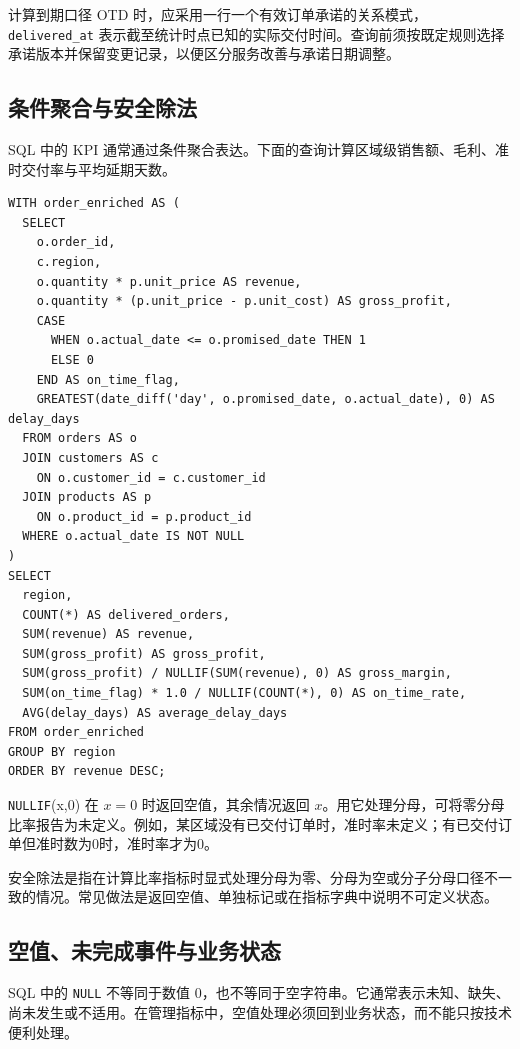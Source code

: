 计算到期口径 OTD 时，应采用一行一个有效订单承诺的关系模式，\texttt{delivered\_at} 表示截至统计时点已知的实际交付时间。查询前须按既定规则选择承诺版本并保留变更记录，以便区分服务改善与承诺日期调整。

\subsection{条件聚合与安全除法}

SQL 中的 KPI 通常通过条件聚合表达。下面的查询计算区域级销售额、毛利、准时交付率与平均延期天数。

\begin{lstlisting}[style=sqlstyle,caption={区域级运营 KPI 查询}]
WITH order_enriched AS (
  SELECT
    o.order_id,
    c.region,
    o.quantity * p.unit_price AS revenue,
    o.quantity * (p.unit_price - p.unit_cost) AS gross_profit,
    CASE
      WHEN o.actual_date <= o.promised_date THEN 1
      ELSE 0
    END AS on_time_flag,
    GREATEST(date_diff('day', o.promised_date, o.actual_date), 0) AS delay_days
  FROM orders AS o
  JOIN customers AS c
    ON o.customer_id = c.customer_id
  JOIN products AS p
    ON o.product_id = p.product_id
  WHERE o.actual_date IS NOT NULL
)
SELECT
  region,
  COUNT(*) AS delivered_orders,
  SUM(revenue) AS revenue,
  SUM(gross_profit) AS gross_profit,
  SUM(gross_profit) / NULLIF(SUM(revenue), 0) AS gross_margin,
  SUM(on_time_flag) * 1.0 / NULLIF(COUNT(*), 0) AS on_time_rate,
  AVG(delay_days) AS average_delay_days
FROM order_enriched
GROUP BY region
ORDER BY revenue DESC;
\end{lstlisting}

\texttt{NULLIF}(x,0) 在 \(x=0\) 时返回空值，其余情况返回 \(x\)。用它处理分母，可将零分母比率报告为未定义。例如，某区域没有已交付订单时，准时率未定义；有已交付订单但准时数为0时，准时率才为0。

\begin{definition}[安全除法]
安全除法是指在计算比率指标时显式处理分母为零、分母为空或分子分母口径不一致的情况。常见做法是返回空值、单独标记或在指标字典中说明不可定义状态。
\end{definition}

\subsection{空值、未完成事件与业务状态}

SQL 中的 \texttt{NULL} 不等同于数值 0，也不等同于空字符串。它通常表示未知、缺失、尚未发生或不适用。在管理指标中，空值处理必须回到业务状态，而不能只按技术便利处理。

